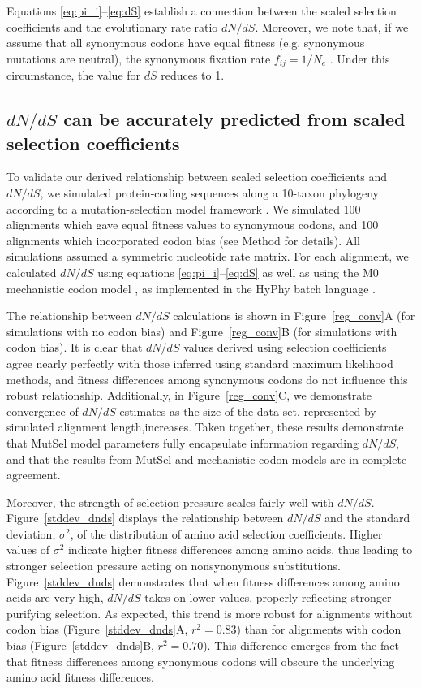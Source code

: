 \documentclass[11pt]{article}
\begin{document}
Equations \eqref{eq:pi_i}--\eqref{eq:dS} establish a connection between the scaled selection coefficients and the evolutionary rate ratio $dN/dS$. Moreover, we note that, if we assume that all synonymous codons have equal fitness (e.g. synonymous mutations are neutral), the synonymous fixation rate $f_{ij}= 1/N_e$ \cite{CrowKimura1970}. Under this circumstance, the value for $dS$ reduces to 1.


\subsection*{$dN/dS$ can be accurately predicted from scaled selection coefficients}

To validate our derived relationship between scaled selection coefficients and $dN/dS$, we simulated protein-coding sequences along a 10-taxon phylogeny according to a mutation-selection model framework \cite{HalpernBruno1998,SellaHirsh2005}. We simulated 100 alignments which gave equal fitness values to synonymous codons, and 100 alignments which incorporated codon bias (see Method for details). All simulations assumed a symmetric nucleotide rate matrix. For each alignment, we calculated $dN/dS$ using equations \eqref{eq:pi_i}--\eqref{eq:dS} as well as using the M0 mechanistic codon model \cite{NielsenYang1998}, as implemented in the HyPhy batch language \cite{KosakovskyPondetal2005}.

The relationship between $dN/dS$ calculations is shown in Figure~\ref{reg_conv}A (for simulations with no codon bias) and Figure~\ref{reg_conv}B (for simulations with codon bias). It is clear that $dN/dS$ values derived using selection coefficients agree nearly perfectly with those inferred using standard maximum likelihood methods, and fitness differences among synonymous codons do not influence this robust relationship. Additionally, in Figure~\ref{reg_conv}C, we demonstrate convergence of $dN/dS$ estimates as the size of the data set, represented by simulated alignment length,increases. Taken together, these results demonstrate that MutSel model parameters fully encapsulate information regarding $dN/dS$, and that the results from MutSel and mechanistic codon models are in complete agreement.

Moreover, the strength of selection pressure scales fairly well with $dN/dS$. Figure~\ref{stddev_dnds} displays the relationship between $dN/dS$ and the standard deviation, $\sigma^2$, of the distribution of amino acid selection coefficients. Higher values of $\sigma^2$ indicate higher fitness differences among amino acids, thus leading to stronger selection pressure acting on nonsynonymous substitutions. Figure~\ref{stddev_dnds} demonstrates that when fitness differences among amino acids are very high, $dN/dS$ takes on lower values, properly reflecting stronger purifying selection. As expected, this trend is more robust for alignments without codon bias (Figure~\ref{stddev_dnds}A, $r^2 = 0.83$) than for alignments with codon bias (Figure~\ref{stddev_dnds}B, $r^2 = 0.70$). This difference emerges from the fact that fitness differences among synonymous codons will obscure the underlying amino acid fitness differences.
\end{document}

